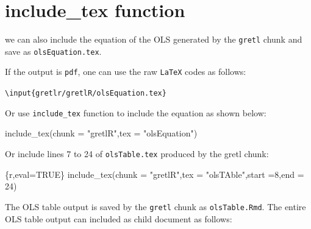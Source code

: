 \documentclass[
  letterpaper,
  DIV=11,
  numbers=noendperiod]{scrartcl}
\newenvironment{Shaded}{\begin{snugshade}}{\end{snugshade}}
\newcommand{\AttributeTok}[1]{\textcolor[rgb]{0.40,0.45,0.13}{#1}}
\newcommand{\DecValTok}[1]{\textcolor[rgb]{0.68,0.00,0.00}{#1}}
\newcommand{\FunctionTok}[1]{\textcolor[rgb]{0.28,0.35,0.67}{#1}}
\newcommand{\InformationTok}[1]{\textcolor[rgb]{0.37,0.37,0.37}{#1}}
\newcommand{\NormalTok}[1]{\textcolor[rgb]{0.00,0.23,0.31}{#1}}
\newcommand{\StringTok}[1]{\textcolor[rgb]{0.13,0.47,0.30}{#1}}
\begin{document}
\hypertarget{include_tex-function}{%
\section{include\_tex function}\label{include_tex-function}}

we can also include the equation of the OLS generated by the
\texttt{gretl} chunk and save as \texttt{olsEquation.tex}.

If the output is \texttt{pdf}, one can use the raw \texttt{LaTeX} codes
as follows:

\texttt{\textbackslash{}input\{gretlr/gretlR/olsEquation.tex\}}

Or use \texttt{include\_tex} function to include the equation as shown
below:

\begin{Shaded}
\begin{Highlighting}[]
\FunctionTok{include\_tex}\NormalTok{(}\AttributeTok{chunk =} \StringTok{"gretlR"}\NormalTok{,}\AttributeTok{tex =} \StringTok{"olsEquation"}\NormalTok{)}
\end{Highlighting}
\end{Shaded}

Or include lines 7 to 24 of \texttt{olsTable.tex} produced by the gretl
chunk:

\begin{Shaded}
\begin{Highlighting}[]
\InformationTok{\textasciigrave{}\textasciigrave{}\textasciigrave{}\{r,eval=TRUE\}}
\FunctionTok{include\_tex}\NormalTok{(}\AttributeTok{chunk =} \StringTok{"gretlR"}\NormalTok{,}\AttributeTok{tex =} \StringTok{"olsTAble"}\NormalTok{,}\AttributeTok{start =}\DecValTok{8}\NormalTok{,}\AttributeTok{end =} \DecValTok{24}\NormalTok{)}
\InformationTok{\textasciigrave{}\textasciigrave{}\textasciigrave{}}
\end{Highlighting}
\end{Shaded}



The OLS table output is saved by the \texttt{gretl} chunk as
\texttt{olsTable.Rmd}. The entire OLS table output can included as child
document as follows:
\end{document}
